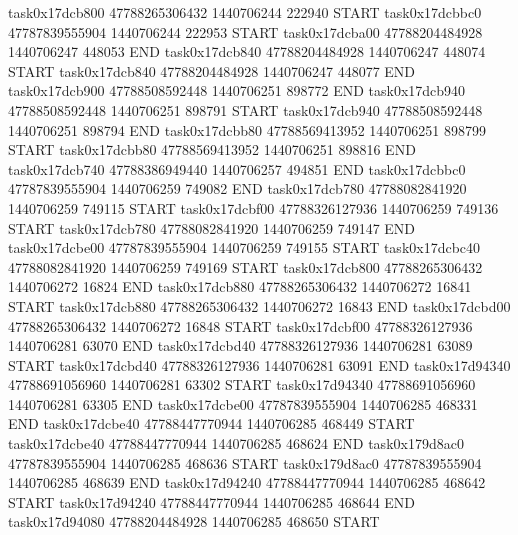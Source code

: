 task0x17dcb800 47788265306432          1440706244               222940  START
task0x17dcbbc0 47787839555904          1440706244               222953  START
task0x17dcba00 47788204484928          1440706247               448053  END
task0x17dcb840 47788204484928          1440706247               448074  START
task0x17dcb840 47788204484928          1440706247               448077  END
task0x17dcb900 47788508592448          1440706251               898772  END
task0x17dcb940 47788508592448          1440706251               898791  START
task0x17dcb940 47788508592448          1440706251               898794  END
task0x17dcbb80 47788569413952          1440706251               898799  START
task0x17dcbb80 47788569413952          1440706251               898816  END
task0x17dcb740 47788386949440          1440706257               494851  END
task0x17dcbbc0 47787839555904          1440706259               749082  END
task0x17dcb780 47788082841920          1440706259               749115  START
task0x17dcbf00 47788326127936          1440706259               749136  START
task0x17dcb780 47788082841920          1440706259               749147  END
task0x17dcbe00 47787839555904          1440706259               749155  START
task0x17dcbc40 47788082841920          1440706259               749169  START
task0x17dcb800 47788265306432          1440706272                16824  END
task0x17dcb880 47788265306432          1440706272                16841  START
task0x17dcb880 47788265306432          1440706272                16843  END
task0x17dcbd00 47788265306432          1440706272                16848  START
task0x17dcbf00 47788326127936          1440706281                63070  END
task0x17dcbd40 47788326127936          1440706281                63089  START
task0x17dcbd40 47788326127936          1440706281                63091  END
task0x17d94340 47788691056960          1440706281                63302  START
task0x17d94340 47788691056960          1440706281                63305  END
task0x17dcbe00 47787839555904          1440706285               468331  END
task0x17dcbe40 47788447770944          1440706285               468449  START
task0x17dcbe40 47788447770944          1440706285               468624  END
task0x179d8ac0 47787839555904          1440706285               468636  START
task0x179d8ac0 47787839555904          1440706285               468639  END
task0x17d94240 47788447770944          1440706285               468642  START
task0x17d94240 47788447770944          1440706285               468644  END
task0x17d94080 47788204484928          1440706285               468650  START

